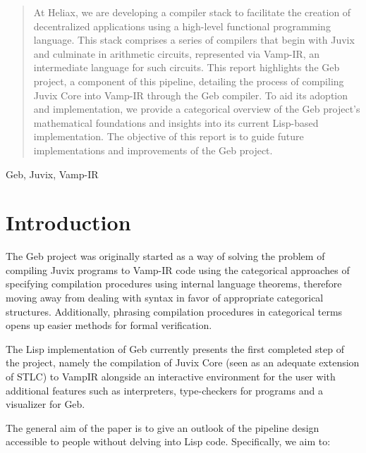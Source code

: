 



\begin{abstract}
  At Heliax, we are developing a compiler stack to facilitate the creation
  of decentralized applications using a high-level functional programming
  language. This stack comprises a series of compilers that begin with
  Juvix and culminate in arithmetic circuits, represented via Vamp-IR, an
  intermediate language for such circuits. This report highlights the Geb
  project, a component of this pipeline, detailing the process of compiling
  Juvix Core into Vamp-IR through the Geb compiler. To aid its adoption and
  implementation, we provide a categorical overview of the Geb project's
  mathematical foundations and insights into its current Lisp-based
  implementation. The objective of this report is to guide future
  implementations and improvements of the Geb project.
\end{abstract}


\begin{keywords}
Geb, Juvix, Vamp-IR
\end{keywords}
\maketitle
\section{Introduction}

The Geb project was originally started as a way of solving the problem of compiling Juvix programs to Vamp-IR code using the categorical approaches of specifying compilation procedures using internal language theorems, therefore moving away from dealing with syntax in favor of appropriate categorical structures. Additionally, phrasing compilation procedures in categorical terms opens up easier methods for formal verification.

The Lisp implementation of Geb currently presents the first completed step of the project, namely the compilation of Juvix Core (seen as an adequate extension of STLC) to VampIR alongside an interactive environment for the user with additional features such as interpreters, type-checkers for programs and a visualizer for Geb.

The general aim of the paper is to give an outlook of the pipeline design accessible to people without delving into Lisp code. Specifically, we aim to:

